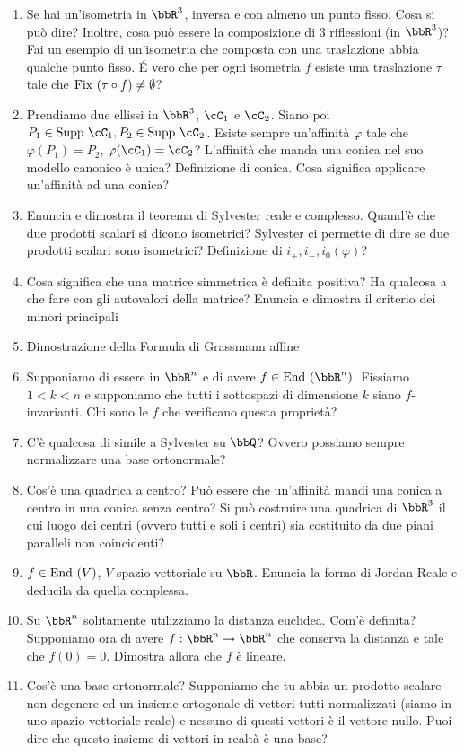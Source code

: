 \documentclass[a4paper,NoNotes,GeneralMath]{stdmdoc}
\begin{document}
\begin{enumerate}
		\item Se hai un'isometria in $\bbR^3$, inversa e con almeno un punto fisso. Cosa si può dire? Inoltre, cosa può essere la composizione di 3 riflessioni (in $\bbR^3$)? Fai un esempio di un'isometria che composta con una traslazione abbia qualche punto fisso. \'E vero che per ogni isometria $f$ esiste una traslazione $\tau$ tale che $\mbox{Fix } (\tau\circ f) \neq \emptyset$?
		\item Prendiamo due ellissi in $\bbR^3$, $\cC_1$ e $\cC_2$. Siano poi $P_1 \in \text{Supp } \cC_1, P_2 \in \text{Supp } \cC_2$. Esiste sempre un'affinità $\varphi$ tale che $\varphi(P_1) = P_2$, $\varphi(\cC_1) = \cC_2$? L'affinità che manda una conica nel suo modello canonico è unica? Definizione di conica. Cosa significa applicare un'affinità ad una conica?
		\item Enuncia e dimostra il teorema di Sylvester reale e complesso. Quand'è che due prodotti scalari si dicono isometrici? Sylvester ci permette di dire se due prodotti scalari sono isometrici? Definizione di $i_{+}, i_{-}, i_0 (\varphi)$?
		\item Cosa significa che una matrice simmetrica è definita positiva? Ha qualcosa a che fare con gli autovalori della matrice? Enuncia e dimostra il criterio dei minori principali
		\item Dimostrazione della Formula di Grassmann affine
		\item Supponiamo di essere in $\bbR^n$ e di avere $f\in\End(\bbR^n)$. Fissiamo $1 < k < n$ e supponiamo che tutti i sottospazi di dimensione $k$ siano $f$-invarianti. Chi sono le $f$ che verificano questa proprietà?
		\item C'è qualcosa di simile a Sylvester su $\bbQ$? Ovvero possiamo sempre normalizzare una base ortonormale?
		\item Cos'è una quadrica a centro? Può essere che un'affinità mandi una conica a centro in una conica senza centro? Si può costruire una quadrica di $\bbR^3$ il cui luogo dei centri (ovvero tutti e soli i centri) sia costituito da due piani paralleli non coincidenti?
		\item $f\in\mbox{End }(V)$, $V$ spazio vettoriale su $\bbR$. Enuncia la forma di Jordan Reale e deducila da quella complessa.
		\item Su $\bbR^n$ solitamente utilizziamo la distanza euclidea. Com'è definita? Supponiamo ora di avere $f: \bbR^n \rar \bbR^n$ che conserva la distanza e tale che $f(0) = 0$. Dimostra allora che $f$ è lineare.
		\item Cos'è una base ortonormale? Supponiamo che tu abbia un prodotto scalare non degenere ed un insieme ortogonale di vettori tutti normalizzati (siamo in uno spazio vettoriale reale) e nessuno di questi vettori è il vettore nullo. Puoi dire che questo insieme di vettori in realtà è una base?

\end{enumerate}
\end{document}

